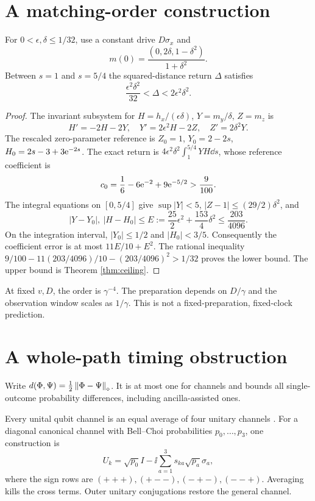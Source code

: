 \documentclass[11pt]{article}
\begin{document}
\section{A matching-order construction}
\begin{proposition}\label{prop:lower}
For $0<\epsilon,\delta\leq1/32$, use a constant drive $D\sigma_x$ and
\[
 m(0)=\frac{(0,2\delta,1-\delta^2)}{1+\delta^2}.
\]
Between $s=1$ and $s=5/4$ the squared-distance return $\Delta$ satisfies
\[
 \frac{\epsilon^2\delta^2}{32}<\Delta<2\epsilon^2\delta^2.
\]
\end{proposition}
\begin{proof}
The invariant subsystem for
$H=h_x/(\epsilon\delta)$, $Y=m_y/\delta$, $Z=m_z$ is
\[
 H'=-2H-2Y,\quad Y'=2\epsilon^2H-2Z,\quad Z'=2\delta^2Y.
\]
The rescaled zero-parameter reference is
$Z_0=1$, $Y_0=2-2s$, $H_0=2s-3+3\mathrm e^{-2s}$.
The exact return is $4\epsilon^2\delta^2\int_1^{5/4}YH\dd s$,
whose reference coefficient is
\[
 c_0=\frac16-6\mathrm e^{-2}+9\mathrm e^{-5/2}>\frac9{100}.
\]
The integral equations on $[0,5/4]$ give
$\sup|Y|<5$, $|Z-1|\leq(29/2)\delta^2$, and
\[
 |Y-Y_0|,\ |H-H_0|\leq
 E:=\frac{25}{2}\epsilon^2+\frac{153}{4}\delta^2\leq\frac{203}{4096}.
\]
On the integration interval, $|Y_0|\leq1/2$ and $|H_0|<3/5$.
Consequently the coefficient error is at most $11E/10+E^2$.
The rational inequality
$9/100-11(203/4096)/10-(203/4096)^2>1/32$ proves the lower bound.
The upper bound is Theorem \ref{thm:ceiling}.
\end{proof}
At fixed $v,D$, the order is $\gamma^{-4}$. The preparation depends on
$D/\gamma$ and the observation window scales as $1/\gamma$.
This is not a fixed-preparation, fixed-clock prediction.

\section{A whole-path timing obstruction}
Write
$d(\Phi,\Psi)=\frac12\left\lVert \Phi-\Psi\right\rVert_\diamond$.
It is at most one for channels and bounds all single-outcome probability
differences, including ancilla-assisted ones.

Every unital qubit channel is an equal average of four unitary channels
\cite{LiChoi}. For a diagonal canonical channel with Bell--Choi
probabilities $p_0,\ldots,p_3$, one construction is
\[
 U_k=\sqrt{p_0}I-\ii\sum_{a=1}^3s_{ka}\sqrt{p_a}\sigma_a ,
\]
where the sign rows are $(+++),(+--),(-+-),(--+)$. Averaging kills
the cross terms. Outer unitary conjugations restore the general channel.
\end{document}
